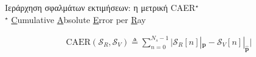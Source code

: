 \begin{frame}{Ιεράρχηση σφαλμάτων εκτιμήσεων: η μετρική CAER$^\star$ \\ \scriptsize $^\star$ \underline{C}umulative \underline{A}bsolute \underline{E}rror per \underline{R}ay}

  \vspace{-0.5cm}
  \begin{align}
    \text{CAER}(\mathcal{S}_R, \mathcal{S}_V) \triangleq \sum\limits_{n=0}^{N_s-1}\Big|\mathcal{S}_R[n]|_{\bm{p}}-\mathcal{S}_V[n]|_{\hat{\bm{p}}} \Big| \nonumber
  \end{align}

  \vspace{-0.5cm}
  \begin{figure}
    
  \end{figure}


\end{frame}
